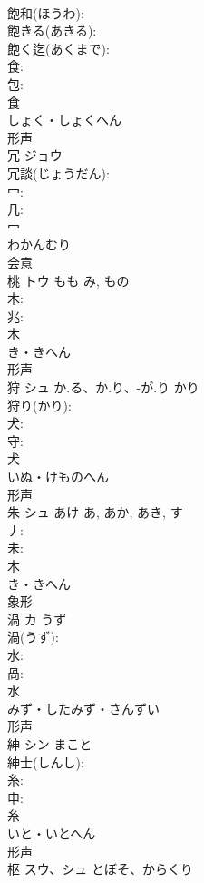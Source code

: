 \documentclass[8pt]{extreport}
\begin{document}
\begin{CJK}{UTF8}{min}
\\	飽和(ほうわ): 
\\	飽きる(あきる): 
\\	飽く迄(あくまで): 
\\	食: 
\\	包: 
\\	食	
\\	しょく・しょくへん	
\\	形声 
\\	冗	ジョウ			
\\	冗談(じょうだん): 
\\	冖: 
\\	几: 
\\	冖	
\\	わかんむり	
\\	会意 
\\	桃	トウ	もも	み, もの	
\\	木: 
\\	兆: 
\\	木	
\\	き・きへん	
\\	形声 
\\	狩	シュ	か.る、か.り、-が.り	かり	
\\	狩り(かり): 
\\	犬: 
\\	守: 
\\	犬	
\\	いぬ・けものへん	
\\	形声 
\\	朱	シュ	あけ	あ, あか, あき, す	
\\	丿: 
\\	未: 
\\	木	
\\	き・きへん	
\\	象形 
\\	渦	カ	うず		
\\	渦(うず): 
\\	水: 
\\	咼: 
\\	水	
\\	みず・したみず・さんずい	
\\	形声 
\\	紳	シン		まこと	
\\	紳士(しんし): 
\\	糸: 
\\	申: 
\\	糸	
\\	いと・いとへん	
\\	形声 
\\	枢	スウ、シュ	とぼそ、からくり		

\end{CJK}
\end{document}
